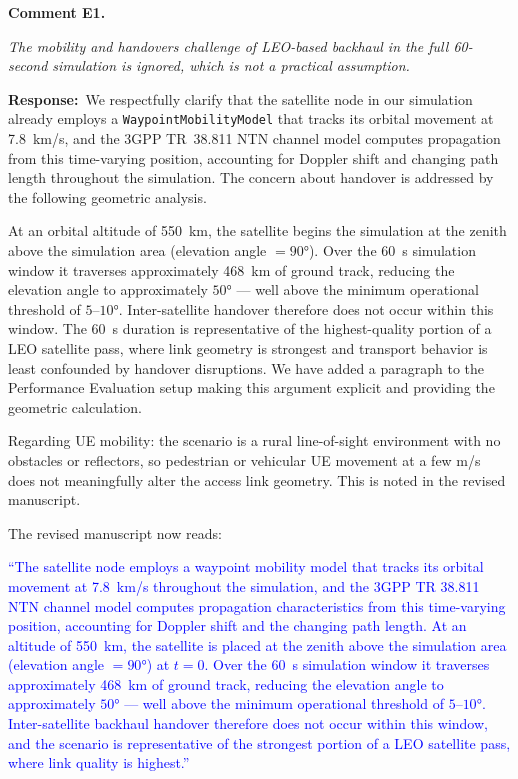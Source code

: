 \documentclass[11pt]{article}
\newcommand{\comment}[2]{\vspace{0.8em}\noindent\textbf{Comment #1.}\begin{reviewbox}\textit{#2}\end{reviewbox}}
\newcommand{\response}{\noindent\textbf{Response:}~}
\newcommand{\revised}[1]{\textcolor{blue}{``#1''}}
\begin{document}
\comment{E1}{The mobility and handovers challenge of LEO-based backhaul in the full 60-second simulation is ignored, which is not a practical assumption.}

\response We respectfully clarify that the satellite node in our simulation already employs a \texttt{WaypointMobilityModel} that tracks its orbital movement at 7.8~km/s, and the 3GPP TR~38.811 NTN channel model computes propagation from this time-varying position, accounting for Doppler shift and changing path length throughout the simulation. The concern about handover is addressed by the following geometric analysis.

At an orbital altitude of 550~km, the satellite begins the simulation at the zenith above the simulation area (elevation angle $= 90°$). Over the 60~s simulation window it traverses approximately 468~km of ground track, reducing the elevation angle to approximately $50°$ — well above the minimum operational threshold of $5$--$10°$. Inter-satellite handover therefore does not occur within this window. The 60~s duration is representative of the highest-quality portion of a LEO satellite pass, where link geometry is strongest and transport behavior is least confounded by handover disruptions. We have added a paragraph to the Performance Evaluation setup making this argument explicit and providing the geometric calculation.

Regarding UE mobility: the scenario is a rural line-of-sight environment with no obstacles or reflectors, so pedestrian or vehicular UE movement at a few m/s does not meaningfully alter the access link geometry. This is noted in the revised manuscript.

The revised manuscript now reads:

\revised{The satellite node employs a waypoint mobility model that tracks its orbital movement at 7.8~km/s throughout the simulation, and the 3GPP TR 38.811 NTN channel model computes propagation characteristics from this time-varying position, accounting for Doppler shift and the changing path length. At an altitude of 550~km, the satellite is placed at the zenith above the simulation area (elevation angle $= 90°$) at $t = 0$. Over the 60~s simulation window it traverses approximately 468~km of ground track, reducing the elevation angle to approximately $50°$ — well above the minimum operational threshold of $5$--$10°$. Inter-satellite backhaul handover therefore does not occur within this window, and the scenario is representative of the strongest portion of a LEO satellite pass, where link quality is highest.}
\end{document}
